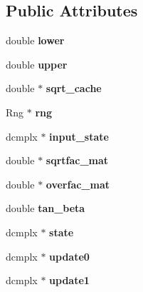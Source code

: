 \subsection*{Public Attributes}
\begin{DoxyCompactItemize}
\item 
\hypertarget{classPhase_a8b7dbdfafd0e3c84dba4138cace2e00b}{}double {\bfseries lower}\label{classPhase_a8b7dbdfafd0e3c84dba4138cace2e00b}

\item 
\hypertarget{classPhase_abe5215ac7a99447da0f2075e87b6e1d1}{}double {\bfseries upper}\label{classPhase_abe5215ac7a99447da0f2075e87b6e1d1}

\item 
\hypertarget{classPhase_a9508675d9cd23e96e4e5af0f3514d64e}{}double $\ast$ {\bfseries sqrt\+\_\+cache}\label{classPhase_a9508675d9cd23e96e4e5af0f3514d64e}

\item 
\hypertarget{classPhase_abcd241887b2113672f6dc94877b79079}{}Rng $\ast$ {\bfseries rng}\label{classPhase_abcd241887b2113672f6dc94877b79079}

\item 
\hypertarget{classPhase_a33f2132e12b166e3c7fe0059f67c71f9}{}dcmplx $\ast$ {\bfseries input\+\_\+state}\label{classPhase_a33f2132e12b166e3c7fe0059f67c71f9}

\item 
\hypertarget{classPhase_a64295bfa90607498ff8c544122afc3f9}{}double $\ast$ {\bfseries sqrtfac\+\_\+mat}\label{classPhase_a64295bfa90607498ff8c544122afc3f9}

\item 
\hypertarget{classPhase_a76beec42b9bfdcd105edcb8505bab934}{}double $\ast$ {\bfseries overfac\+\_\+mat}\label{classPhase_a76beec42b9bfdcd105edcb8505bab934}

\item 
\hypertarget{classPhase_a5ed12bc03ed5641e7d6486aefbc33ee3}{}double {\bfseries tan\+\_\+beta}\label{classPhase_a5ed12bc03ed5641e7d6486aefbc33ee3}

\item 
\hypertarget{classPhase_ab563c75af841b7c481f805d8a026518e}{}dcmplx $\ast$ {\bfseries state}\label{classPhase_ab563c75af841b7c481f805d8a026518e}

\item 
\hypertarget{classPhase_a29c2f7fd9df0afc222d810d037ea9ded}{}dcmplx $\ast$ {\bfseries update0}\label{classPhase_a29c2f7fd9df0afc222d810d037ea9ded}

\item 
\hypertarget{classPhase_aef5f586464d8609c933b2c28afc1fbf1}{}dcmplx $\ast$ {\bfseries update1}\label{classPhase_aef5f586464d8609c933b2c28afc1fbf1}

\end{DoxyCompactItemize}


